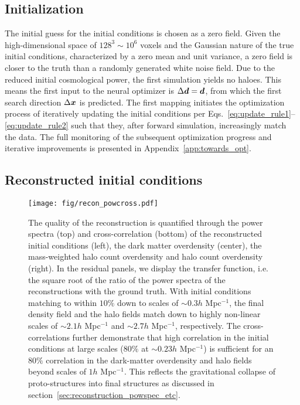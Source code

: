 \subsection{Initialization}
\label{sec:towards_optimum}
The initial guess for the initial conditions is chosen as a zero field. Given the high-dimensional space of $128^3 \sim 10^6$ voxels and the Gaussian nature of the true initial conditions, characterized by a zero mean and unit variance, a zero field is closer to the truth than a randomly generated white noise field. Due to the reduced initial cosmological power, the first simulation yields no haloes. This means the first input to the neural optimizer is $\Delta \boldsymbol{d} = \boldsymbol{d}$, from which the first search direction $\Delta \boldsymbol{x}$ is predicted. The first mapping initiates the optimization process of iteratively updating the initial conditions per Eqs.~\eqref{eq:update_rule1}–\eqref{eq:update_rule2} such that they, after forward simulation, increasingly match the data. The full monitoring of the subsequent optimization progress and iterative improvements is presented in Appendix~\ref{app:towards_opt}. 

\subsection{Reconstructed initial conditions}
\label{sec:reconstructions}
\begin{figure*}
    \centering
    \texttt{[image: fig/recon\_powcross.pdf]}
    \vspace{-1.8em}
    \caption{The quality of the reconstruction is quantified through the power spectra (top) and cross-correlation (bottom) of the reconstructed initial conditions (left), the dark matter overdensity (center), the mass-weighted halo count overdensity and halo count overdensity (right). In the residual panels, we display the transfer function, i.e. the square root of the ratio of the power spectra of the reconstructions with the ground truth. With initial conditions matching to within $10\%$ down to scales of $\sim 0.3h$ Mpc$^{-1}$, the final density field and the halo fields match down to highly non-linear scales of $\sim 2.1h$ Mpc$^{-1}$ and $\sim 2.7h$ Mpc$^{-1}$, respectively. The cross-correlations further demonstrate that high correlation in the initial conditions at large scales ($80\%$ at $\sim0.23h$ Mpc$^{-1}$) is sufficient for an $80\%$ correlation in the dark-matter overdensity and halo fields beyond scales of $1h$ Mpc$^{-1}$. This reflects the gravitational collapse of proto-structures into final structures as discussed in section~\ref{sec:reconstruction_powspec_etc}.}
    \label{fig:reconstruciton_powspec}
\end{figure*}

